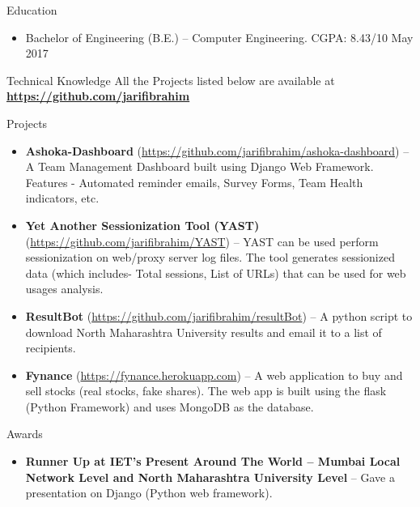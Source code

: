 \documentclass[]{mcdowellcv}
\begin{document}
	\begin{cvsection}{Education}
		\begin{cvsubsection}{}{}{}
			\begin{itemize}
				\item Bachelor of Engineering (B.E.) -- Computer Engineering. CGPA: 8.43/10 \hfill May 2017
			\end{itemize}
		\end{cvsubsection}
	\end{cvsection}
	\begin{cvsection}{Technical Knowledge}{}{}
	All the Projects listed below are available at     \textbf{\url{https://github.com/jarifibrahim}}   \\     \begin{cvsubsection}{Projects}{}{}
			\begin{itemize}
			    
			    \item \textbf{Ashoka-Dashboard} (\url{https://github.com/jarifibrahim/ashoka-dashboard}) -- A Team Management Dashboard built using Django Web Framework. Features - Automated reminder emails, Survey Forms, Team Health indicators, etc.
			    
				\item \textbf{Yet Another Sessionization Tool (YAST)}
				(\url{https://github.com/jarifibrahim/YAST}) -- YAST can be used perform sessionization on web/proxy server log files. The tool generates sessionized data (which includes- Total sessions, List of URLs) that can be used for web usages analysis.
				
	    		\item \textbf{ResultBot}                (\url{https://github.com/jarifibrahim/resultBot}) -- A python script to download North Maharashtra University results and email it to a list of recipients. 
			    
			    \item \textbf{Fynance} (\url{https://fynance.herokuapp.com})
			        -- A web application to buy and sell stocks (real stocks, fake shares). The web app is built using the flask (Python Framework) and uses MongoDB as the database.
			\end{itemize}
		\end{cvsubsection}
	\end{cvsection}
	
	\begin{cvsection}{Awards}
		\begin{cvsubsection}{}{}{}	
			\begin{itemize}
				\item \textbf{Runner Up at IET's Present Around The World -- Mumbai Local Network Level and North Maharashtra University Level} -- Gave a presentation on Django (Python web framework).
			\end{itemize}
		\end{cvsubsection}
	\end{cvsection}
	
\end{document}
